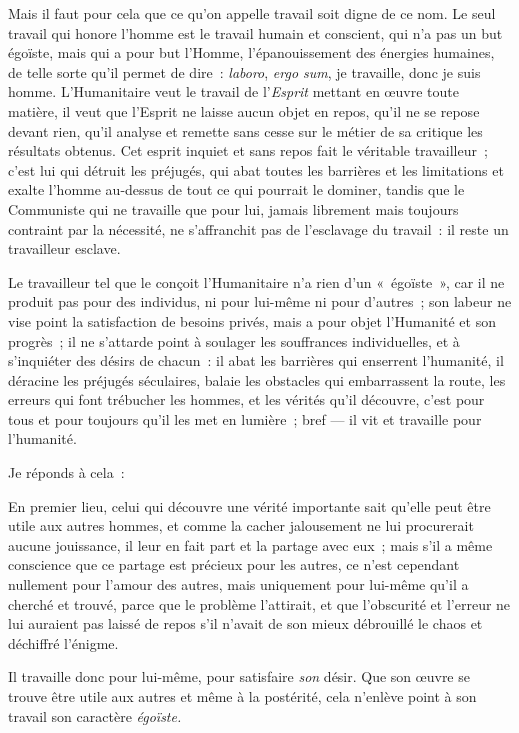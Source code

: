 \documentclass[french,twoside]{book} %
\begin{document}
 Mais il faut pour cela que ce qu’on appelle travail soit digne de ce nom. Le seul travail qui honore l’homme est le travail humain et conscient, qui n’a pas un but égoïste, mais qui a pour but l’Homme, l’épanouissement des énergies humaines, de telle sorte qu’il permet de dire : \emph{laboro}, \emph{ergo sum}, je travaille, donc je suis homme. L’Humanitaire veut le travail de l’\emph{Esprit} mettant en œuvre toute matière, il veut que l’Esprit ne laisse aucun objet en repos, qu’il ne se repose devant rien, qu’il analyse et remette sans cesse sur le métier de sa critique les résultats obtenus. Cet esprit inquiet et sans repos fait le véritable travailleur ; c’est lui qui détruit les préjugés, qui abat toutes les barrières et les limitations et exalte l’homme au-dessus de tout ce qui pourrait le dominer, tandis que le Communiste qui ne travaille que pour lui, jamais librement mais toujours contraint par la nécessité, ne s’affranchit pas de l’esclavage du travail : il reste un travailleur esclave.\par
Le travailleur tel que le conçoit l’Humanitaire n’a rien d’un « égoïste », car il ne produit pas pour des individus, ni pour lui-même ni pour d’autres ; son labeur ne vise point la satisfaction de besoins privés, mais a pour objet l’Humanité et son progrès ; il ne s’attarde point à soulager les souffrances individuelles, et à s’inquiéter des désirs de chacun : il abat les barrières qui enserrent l’humanité, il déracine les préjugés séculaires, balaie les obstacles qui embarrassent la route, les erreurs qui font trébucher les hommes, et les vérités qu’il découvre, c’est pour tous et pour toujours qu’il les met en lumière ; bref — il vit et travaille pour l’humanité.\par
Je réponds à cela :\par
En premier lieu, celui qui découvre une vérité importante sait qu’elle peut être utile aux autres hommes, et comme la cacher jalousement ne lui procurerait aucune jouissance, il leur en fait part et la partage avec eux ; mais s’il a même conscience que ce partage est  précieux pour les autres, ce n’est cependant nullement pour l’amour des autres, mais uniquement pour lui-même qu’il a cherché et trouvé, parce que le problème l’attirait, et que l’obscurité et l’erreur ne lui auraient pas laissé de repos s’il n’avait de son mieux débrouillé le chaos et déchiffré l’énigme.\par
Il travaille donc pour lui-même, pour satisfaire \emph{son} désir. Que son œuvre se trouve être utile aux autres et même à la postérité, cela n’enlève point à son travail son caractère \emph{égoïste.}\par
\end{document}
